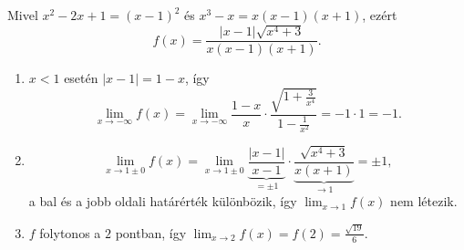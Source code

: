 \documentclass[11pt]{scrartcl}
\begin{document}
Mivel $x^2 - 2x + 1 = (x - 1)^2$ és $x^3 - x = x(x - 1)(x + 1)$, ezért
\[
	f(x) = \frac{|x - 1| \sqrt{x^4 + 3}}{x (x - 1)(x + 1)}.
\]
\begin{enumerate}
	\item $x < 1$ esetén $|x - 1| = 1 - x$, így
	      \[
		      \lim_{x \to -\infty} f(x)
		      = \lim_{x \to -\infty}
		      \frac{1 - x}{x} \cdot
		      \frac{\sqrt{1 + \frac{3}{x^4}}}{1 - \frac{1}{x^2}}
		      = -1 \cdot 1
		      = -1.
	      \]

	\item \[
		      \lim_{x \to 1 \pm 0} f(x)
		      = \lim_{x \to 1 \pm 0}
		      \underbrace{\frac{|x - 1|}{x - 1}}_{= \pm 1} \cdot
		      \underbrace{\frac{\sqrt{x^4 + 3}}{x (x + 1)}}_{\to 1}
		      = \pm 1,
	      \]
	      a bal és a jobb oldali határérték különbözik, így
	      $\lim_{x \to 1} f(x)$ nem létezik.

	\item $f$ folytonos a $2$ pontban, így
	      \(
	      \lim_{x \to 2} f(x) = f(2) = \frac{\sqrt{19}}{6}
	      \).
\end{enumerate}
\end{document}
